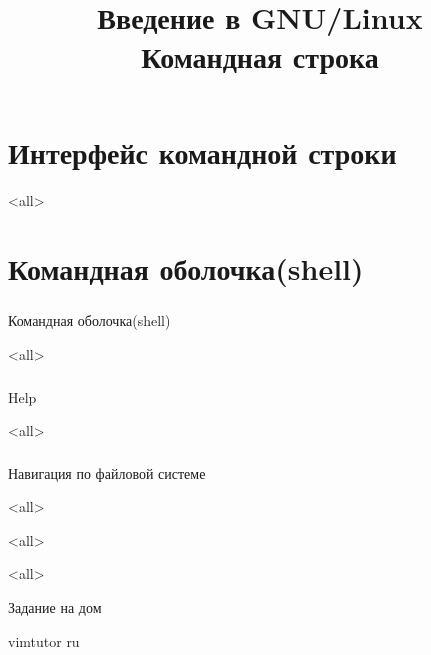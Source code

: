 
\title{Введение в GNU/Linux\\Командная строка}


\begin{frame}
 \frametitle{}
 \titlepage
\end{frame}

\section{Интерфейс командной строки}
\mode<all>{}

\section{ Командная оболочка(shell) }
\begin{frame}
\frametitle{}
 \begin{center}
   {\Large Командная оболочка(shell) }
 \end{center}
\end{frame}


\mode<all>{}
\begin{frame}
\frametitle{}
 \begin{center}
   {\Large Help }
 \end{center}
\end{frame}
\mode<all>{}
\begin{frame}
\frametitle{}
 \begin{center}
   {\Large Навигация по файловой системе }
 \end{center}
\end{frame}
\mode<all>{}

\mode<all>{}

\mode<all>{}


\begin{frame}{Задание на дом}
\begin{block}{}
vimtutor ru
\end{block}
\end{frame}



